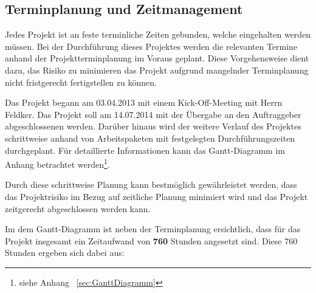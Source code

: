 \subsection{Terminplanung und Zeitmanagement}
\label{sec:TerminplanungUndZeitManagement}

Jedes Projekt ist an feste terminliche Zeiten gebunden, welche eingehalten werden müssen. Bei der Durchführung dieses 
Projektes werden die relevanten Termine anhand der Projektterminplanung im Voraus geplant. Diese Vorgehensweise 
dient dazu, das Risiko zu minimieren das Projekt aufgrund mangelnder Terminplanung nicht fristgerecht fertigstellen zu 
können.

Das Projekt begann am 03.04.2013 mit einem Kick-Off-Meeting mit Herrn Feldker. Das Projekt 
soll am 14.07.2014 mit der Übergabe an den Auftraggeber abgeschlossenen werden. Darüber hinaus wird 
der weitere Verlauf des Projektes schrittweise anhand von 
Arbeitspaketen mit festgelegten Durchführungszeiten durchgeplant. Für detaillierte Informationen kann das Gantt-Diagramm 
im Anhang betrachtet werden\footnote{siehe Anhang ~\ref{sec:GanttDiagramm}}.

Durch diese schrittweise Planung kann bestmöglich gewährleistet werden, dass das  Projektrisiko im Bezug auf zeitliche 
Planung minimiert wird und das Projekt zeitgerecht abgeschlossen werden kann.

Im dem Gantt-Diagramm ist neben der Terminplanung ersichtlich, dass für das Projekt insgesamt ein Zeitaufwand von
\textbf{760} Stunden angesetzt sind. Diese 760 Stunden ergeben sich dabei aus:

